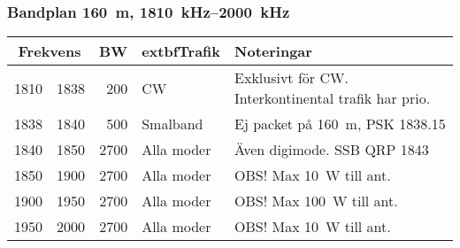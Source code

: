 \subsubsection{Bandplan \qty{160}{\metre}, \SIrange{1810}{2000}{\kilo\hertz}}
\begin{tabular}{rrrll}
\multicolumn{2}{c}{\textbf{Frekvens}} & \textbf{BW} & extbf{Trafik} & \textbf{Noteringar} \\ \hline

1810 & 1838 & 200  & CW         & Exklusivt för CW. Interkontinental trafik har prio. \\ \hline
1838 & 1840 & 500  & Smalband   & Ej packet på \qty{160}{\meter}, PSK \num{1838,15}         \\ \hline
1840 & 1850 & 2700 & Alla moder & Även digimode. SSB QRP \num{1843}                  \\ \hline
1850 & 1900 & 2700 & Alla moder & OBS! Max \qty{10}{\watt} till ant.                       \\ \hline
1900 & 1950 & 2700 & Alla moder & OBS! Max \qty{100}{\watt} till ant.                      \\ \hline
1950 & 2000 & 2700 & Alla moder & OBS! Max \qty{10}{\watt} till ant.                       \\ \hline
\end{tabular}

